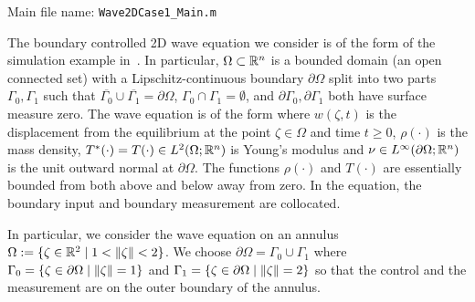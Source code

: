 \documentclass[11pt, a4paper]{amsart}
\theoremstyle{definition}
\numberwithin{equation}{section}
\begin{document}
  \noindent Main file name: \texttt{Wave2DCase1\_Main.m}

  \medskip

  The boundary controlled 2D wave equation we consider is of the form of the simulation example in~\cite{HumKur19}. In particular, 
  $\Omega\subset{\mathbb{R}}^n$ is a bounded domain (an open connected set) with a Lipschitz-continuous boundary $\partial\Omega$ split into two parts $\Gamma_0,\Gamma_1$ such that $\overline{\Gamma_0}\cup\overline{\Gamma_1}=\partial\Omega$, $\Gamma_0\cap\Gamma_1=\emptyset$, and $\partial\Gamma_0,\partial\Gamma_1$ both have surface measure zero. The wave equation is of the form
  where $w(\zeta,t)$ is the displacement from the equilibrium at the point $\zeta\in\Omega$ and time $t\geq0$, $\rho(\cdot)$ is the mass density, $T^*(\cdot)=T(\cdot)\in L^2(\Omega;{\mathbb{R}}^n)$ is Young's modulus and $\nu\in L^\infty(\partial\Omega;{\mathbb{R}}^n)$ is the unit outward normal at $\partial\Omega$. The functions $\rho(\cdot)$ and $T(\cdot)$ are essentially bounded from both above and below away from zero. In the equation, the boundary input and boundary measurement are collocated.

  In particular, we consider the wave equation on an annulus 
  $\Omega := \{\zeta \in \mathbb{R}^2 \mid 1 < \|\zeta\| < 2\}$. 
  We choose $\partial \Omega = \Gamma_0 \cup \Gamma_1$ where $\Gamma_0 = \{\zeta \in \partial\Omega \mid \|\zeta\| = 1\}$ and $\Gamma_1 = \{\zeta \in \partial\Omega \mid \|\zeta\| = 2\}$ so that the control and the measurement are on the outer boundary of the annulus.
\end{document}
